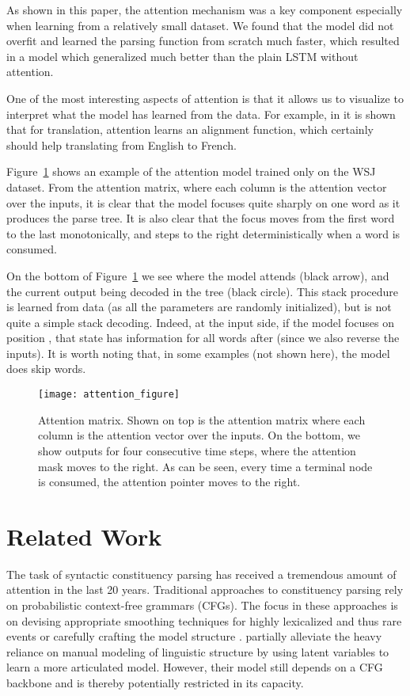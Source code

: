 \documentclass{article} \usepackage{nips15submit_e,times}
\newcommand\citep\cite
\begin{document}
As shown in this paper, the attention mechanism was a key component especially when learning from a relatively small dataset. We found that the model did not overfit and learned the parsing function from scratch much faster, which resulted in a model which generalized much better than the plain LSTM without attention.

One of the most interesting aspects of attention is that it allows us to visualize to interpret what the model has learned from the data. For example, in \cite{bahdanau2014neural} it is shown that for translation, attention learns an alignment function, which certainly should help translating from English to French.

Figure~\ref{fig:attention} shows an example of the attention model trained only on the WSJ dataset. From the attention matrix, where each column is the attention vector over the inputs, it is clear that the model focuses quite sharply on one word as it produces the parse tree. It is also clear that the focus moves from the first word to the last monotonically, and steps to the right deterministically when a word is consumed.

On the bottom of Figure~\ref{fig:attention} we see where the model attends (black arrow), and the current output being decoded in the tree (black circle). This stack procedure is learned from data (as all the parameters are randomly initialized), but is not quite a simple stack decoding. Indeed, at the input side, if the model focuses on position , that state has information for all words after  (since we also reverse the inputs). It is worth noting that, in some examples (not shown here), the model does skip words.

\begin{figure}[t]
\centering
\texttt{[image: attention\_figure]}
\caption{Attention matrix. Shown on top is the attention matrix where each column is the attention vector over the inputs. On the bottom, we show outputs for four consecutive time steps, where the attention mask moves to the right. As can be seen, every time a terminal node is consumed, the attention pointer moves to the right.}
\label{fig:attention}
\end{figure} \vspace{-0mm}
\section{Related Work}
\label{sec:rel}

The task of syntactic constituency parsing  
has received a tremendous amount of attention in the last 20 years.
Traditional approaches to constituency parsing rely on probabilistic
context-free grammars (CFGs).
The focus in these approaches is on devising appropriate smoothing
techniques for highly lexicalized and thus rare 
events \citep{collins:1997:ACL} or carefully crafting the
model structure \citep{klein-manning:2003:ACL}.
\cite{petrov-EtAl:2006:ACL} partially alleviate the heavy reliance on
manual modeling of linguistic structure by using latent variables to learn a
more articulated model.
However, their model still depends on a CFG backbone and is thereby potentially
restricted in its capacity. 
\end{document}
